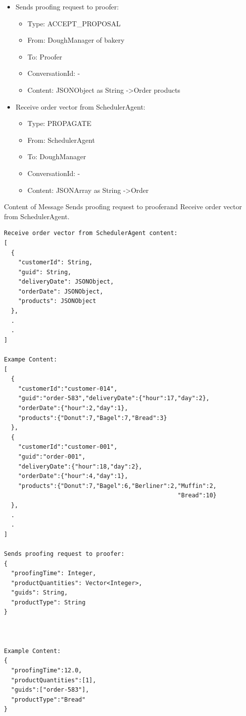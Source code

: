 \documentclass[10pt,a4paper]{article}
\begin{document}
\begin{itemize}
\begin{itemize}
			\item From: SchedulerAgent
			\item To: Any Agent
			\item ConversationId: -
			\item Content: JSONArray as String -\textgreater All scheduled orders
		\end{itemize}
		\item Sends proofing request to proofer:
		\begin{itemize}
			\item Type: ACCEPT\_PROPOSAL
			\item From: DoughManager of bakery
			\item To: Proofer
			\item ConversationId: -
			\item Content: JSONObject as String -\textgreater Order products
		\end{itemize}
		\item Receive order vector from SchedulerAgent:
		\begin{itemize}
			\item Type: PROPAGATE
			\item From: SchedulerAgent
			\item To: DoughManager
			\item ConversationId: -
			\item Content: JSONArray as String -\textgreater Order
		\end{itemize}
	\end{itemize}
	Content of Message \glqq Sends proofing request to proofer\grqq and \glqq Receive order vector from SchedulerAgent\grqq.
	\begin{lstlisting}[frame=single]
Receive order vector from SchedulerAgent content:
[
  {
    "customerId": String,
    "guid": String,
    "deliveryDate": JSONObject,
    "orderDate": JSONObject,
    "products": JSONObject
  },
  .
  .
]

Exampe Content:
[
  {
    "customerId":"customer-014",
    "guid":"order-583","deliveryDate":{"hour":17,"day":2},
    "orderDate":{"hour":2,"day":1},
    "products":{"Donut":7,"Bagel":7,"Bread":3}
  },
  {
    "customerId":"customer-001",
    "guid":"order-001",
    "deliveryDate":{"hour":18,"day":2},
    "orderDate":{"hour":4,"day":1},
    "products":{"Donut":7,"Bagel":6,"Berliner":2,"Muffin":2,
                                                 "Bread":10}
  },
  .
  .
]

Sends proofing request to proofer:
{
  "proofingTime": Integer,
  "productQuantities": Vector<Integer>,
  "guids": String,
  "productType": String
}



Example Content:
{
  "proofingTime":12.0,
  "productQuantities":[1],
  "guids":["order-583"],
  "productType":"Bread"
}
	\end{lstlisting}
\end{document}
